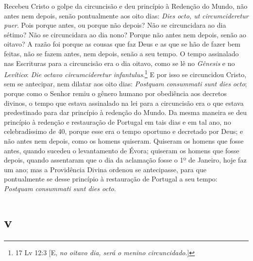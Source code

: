 Recebeu Cristo o golpe da circuncisão e deu princípio à Redenção do
Mundo, não antes nem depois, senão pontualmente aos oito dias:
\emph{Dies octo, ut circumcideretur puer}. Pois porque antes, ou porque
não depois? Não se circuncidara ao dia sétimo? Não se circuncidara ao
dia nono? Porque não antes nem depois, senão ao oitavo? A razão foi
porque as cousas que faz Deus e as que se hão de fazer bem feitas, não
se fazem antes, nem depois, senão a seu tempo. O tempo assinalado nas
Escrituras para a circuncisão era o dia oitavo, como se lê no
\emph{Gênesis} e no \emph{Levítico}: \emph{Die octavo circumcideretur
infantulus}.\footnote{17 Lv 12:3 [E, \textit{no oitavo dia, será o menino circuncidado}.]} E por isso se circuncidou Cristo, sem se antecipar, nem
dilatar aos oito dias: \emph{Postquam consummati sunt dies octo}; porque
como o Senhor remiu o gênero humano por obediência aos decretos divinos,
o tempo que estava assinalado na lei para a circuncisão era o que estava
predestinado para dar princípio à redenção do Mundo. Da mesma maneira se
deu princípio à redenção e restauração de Portugal em tais dias e em tal
ano, no celebradíssimo de 40, porque esse era o tempo oportuno e
decretado por Deus; e não antes nem depois, como os homens quiseram.
Quiseram os homens que fosse antes, quando sucedeu o levantamento de
Évora; quiseram os homens que fosse depois, quando assentaram que o dia
da aclamação fosse o 1º de Janeiro, hoje faz um ano; mas a Providência
Divina ordenou se antecipasse, para que pontualmente se desse princípio
à restauração de Portugal a seu tempo: \emph{Postquam consummati sunt
dies octo}.

\section*{v}

